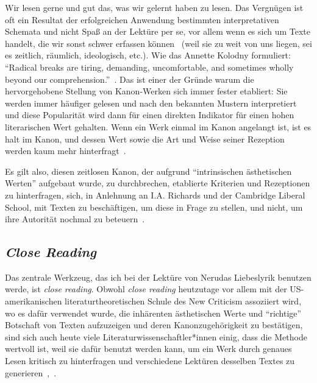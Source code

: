 Wir lesen gerne und gut das, was wir gelernt haben zu lesen.
Das Vergnügen ist oft ein Resultat der erfolgreichen Anwendung bestimmten interpretativen Schemata und nicht Spaß an der Lektüre per se, vor allem wenn es sich um Texte handelt, die wir sonst schwer erfassen können~\cite{Kolodny1980} (weil sie zu weit von uns liegen, sei es zeitlich, räumlich, ideologisch, etc.).
Wie das Annette Kolodny formuliert:
``Radical breaks are tiring, demanding, uncomfortable, and sometimes wholly beyond our comprehension.''~\cite{Kolodny1980}.
Das ist einer der Gründe warum die hervorgehobene Stellung von Kanon-Werken sich immer fester etabliert:
Sie werden immer häufiger gelesen und nach den bekannten Mustern interpretiert und diese Popularität wird dann für einen direkten Indikator für einen hohen literarischen Wert gehalten.
Wenn ein Werk einmal im Kanon angelangt ist, ist es halt im Kanon, und dessen Wert sowie die Art und Weise seiner Rezeption werden kaum mehr hinterfragt~\cite{Kolodny1980}.

Es gilt also, diesen zeitlosen Kanon, der aufgrund ``intrinsischen ästhetischen Werten'' aufgebaut wurde, zu durchbrechen, etablierte Kriterien und Rezeptionen zu hinterfragen, %
sich, in Anlehnung an I.A. Richards und der Cambridge Liberal School, mit Texten zu beschäftigen, um diese in Frage zu stellen, und nicht, um ihre Autorität nochmal zu beteuern~\cite{North2013}.

\begin{comment}
Worüber geschrieben wird und welche Schrifte überliefert werden, prägt auch welche Themen als wichtig angesehen werden.
Was wiederum maßgeblich durch vorherrschende Machtverhältnisse geprägt wird.
\end{comment}


\subsection{\textit{Close Reading}}

Das zentrale Werkzeug, das ich bei der Lektüre von Nerudas Liebeslyrik benutzen werde, ist \textit{close reading}.
Obwohl \textit{close reading} heutzutage vor allem mit der US-amerikanischen literaturtheoretischen Schule des New Criticism assoziiert wird, wo es dafür verwendet wurde, die inhärenten ästhetischen Werte und ``richtige'' Botschaft von Texten aufzuzeigen und deren Kanonzugehörigkeit zu bestätigen, sind sich auch heute viele Literaturwissenschaftler*innen einig, dass die Methode wertvoll ist, weil sie dafür benutzt werden kann, um ein Werk durch genaues Lesen kritisch zu hinterfragen und verschiedene Lektüren desselben Textes zu generieren~\cite{Gallop2007},~\cite{Beehler1988}.

